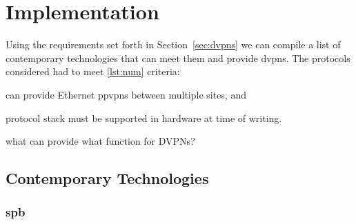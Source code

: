 \section{Implementation} %
\label{sec:implementation}

Using the requirements set forth in Section~\ref{sec:dvpns} we can compile a list of contemporary technologies that can meet them and provide \acp{dvpn}. The protocols considered had to meet \ref{lst:num} criteria:
\begin{inparaenum}[\itshape 1\upshape)]
	\item can provide Ethernet \acp{ppvpn} between multiple sites, and
	\item protocol stack must be supported in hardware at time of writing.
	\label{lst:num}
\end{inparaenum}





what can provide what function for DVPNs?

\subsection{Contemporary Technologies} %
\label{sub:contemporary_technologies}

%

\subsubsection{\acs{spb}} %
\label{ssub:spb}

